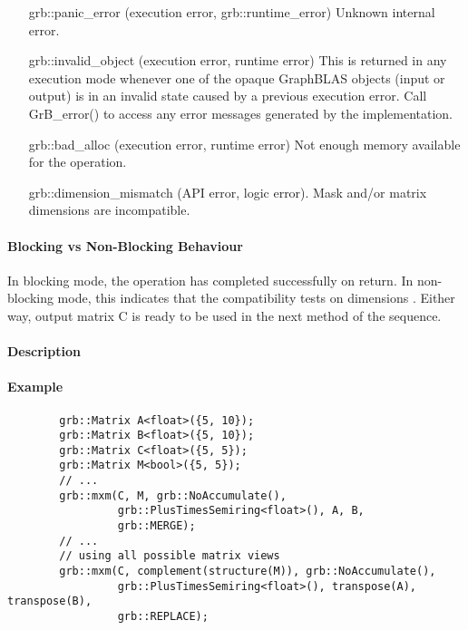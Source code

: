 \begin{itemize}[leftmargin=2.1in]
    \item[{\sf grb::panic\_error}]           (execution error, grb::runtime\_error) Unknown internal error.

    \item[{\sf grb::invalid\_object}] (execution error, runtime error) This is returned in any execution mode 
    whenever one of the opaque GraphBLAS objects (input or output) is in an invalid 
    state caused by a previous execution error.  Call {\sf GrB\_error()} to access 
    any error messages generated by the implementation.

    \item[{\sf grb::bad\_alloc}] (execution error, runtime error) Not enough memory available for the operation.

    \item[{\sf grb::dimension\_mismatch}] (API error, logic error). Mask and/or matrix
    dimensions are incompatible. 
\end{itemize}

\paragraph{Blocking vs Non-Blocking Behaviour}

In blocking mode, the operation has completed successfully on return.
In non-blocking mode, this indicates that the compatibility 
tests on dimensions . 
Either way, output matrix {\sf C} is ready to be used in the next method of
the sequence.

\paragraph{Description}


\paragraph{Example}

\begin{verbatim}
        grb::Matrix A<float>({5, 10});
        grb::Matrix B<float>({5, 10});
        grb::Matrix C<float>({5, 5});
        grb::Matrix M<bool>({5, 5});
        // ...
        grb::mxm(C, M, grb::NoAccumulate(), 
                 grb::PlusTimesSemiring<float>(), A, B,
                 grb::MERGE);
        // ...
        // using all possible matrix views
        grb::mxm(C, complement(structure(M)), grb::NoAccumulate(), 
                 grb::PlusTimesSemiring<float>(), transpose(A), transpose(B),
                 grb::REPLACE);
\end{verbatim}

